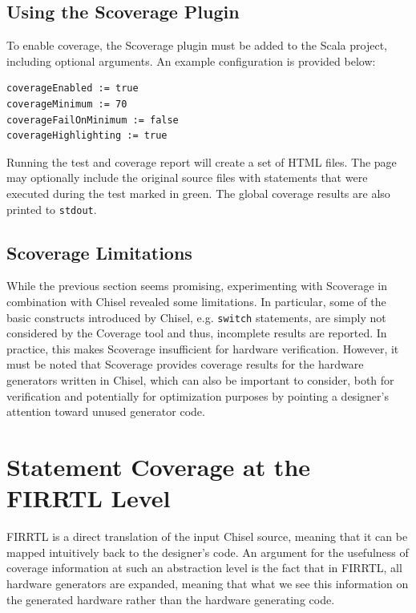 \documentclass[runningheads]{llncs}
\begin{document}
\subsection{Using the Scoverage Plugin}
To enable coverage, the Scoverage plugin must be added to the Scala project, including optional arguments.
An example configuration is provided below:
\begin{verbatim}
coverageEnabled := true
coverageMinimum := 70
coverageFailOnMinimum := false
coverageHighlighting := true
\end{verbatim}
Running the test and coverage report will create a set of HTML files. The page may optionally include the original source files with statements that were executed during the test marked in green. The global coverage results are also printed to \texttt{stdout}.

\subsection{Scoverage Limitations}
While the previous section seems promising, experimenting with Scoverage in combination with Chisel revealed some limitations. In particular, some of the basic constructs introduced by Chisel, e.g. \texttt{switch} statements, are simply not considered by the Coverage tool and thus, incomplete results are reported. In practice, this makes Scoverage insufficient for hardware verification. However, it must be noted that Scoverage provides coverage results for the hardware generators written in Chisel, which can also be important to consider, both for verification and potentially for optimization purposes by pointing a designer's attention toward unused generator code.

\section{Statement Coverage at the FIRRTL Level}  
FIRRTL is a direct translation of the input Chisel source, meaning that it can be mapped intuitively back to the designer's code. An argument for the usefulness of coverage information at such an abstraction level is the fact that in FIRRTL, all hardware generators are expanded, meaning that what we see this information on the generated hardware rather than the hardware generating code. 
\end{document}
